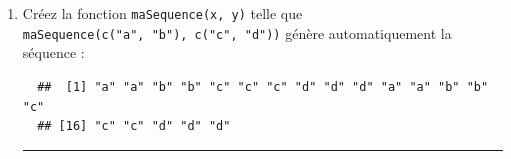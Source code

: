 \documentclass[12pt,twosided, notitlepage]{book}
\newenvironment{Shaded}{}{}
\newcommand{\KeywordTok}[1]{\textcolor[rgb]{0.00,0.00,1.00}{{#1}}}
\newcommand{\DataTypeTok}[1]{{#1}}
\newcommand{\DecValTok}[1]{{#1}}
\newcommand{\CommentTok}[1]{\textcolor[rgb]{0.00,0.50,0.00}{{#1}}}
\newcommand{\NormalTok}[1]{{#1}}
\newif \ifsol
\renewenvironment{Shaded}{\begin{snugshade}}{\end{snugshade}}
\begin{document}
\begin{enumerate}
  \ifsol 

  \begin{center} \rule{0.5\linewidth}{\linethickness}\end{center}

\begin{Shaded}
\begin{Highlighting}[]
\CommentTok{# Utilisation de l'argument times = de rep()}
\KeywordTok{rep}\NormalTok{(}\KeywordTok{c}\NormalTok{(}\DecValTok{1}\NormalTok{, }\DecValTok{2}\NormalTok{), }\DataTypeTok{times =} \DecValTok{2}\NormalTok{)}
  \NormalTok{## [1] 1 2 1 2}

\CommentTok{# Utilisation de l'argument each = de rep()}
\KeywordTok{rep}\NormalTok{(}\KeywordTok{c}\NormalTok{(}\DecValTok{1}\NormalTok{, }\DecValTok{2}\NormalTok{), }\DataTypeTok{each =} \DecValTok{3}\NormalTok{)}
  \NormalTok{## [1] 1 1 1 2 2 2}

\CommentTok{# Deux possibilités ici : }
\CommentTok{# - enchasser le second appel de rep() dans le premier}
\KeywordTok{rep}\NormalTok{(}\KeywordTok{rep}\NormalTok{(}\KeywordTok{c}\NormalTok{(}\DecValTok{1}\NormalTok{, }\DecValTok{2}\NormalTok{), }\DataTypeTok{each =} \DecValTok{3}\NormalTok{), }\DataTypeTok{times =} \DecValTok{2}\NormalTok{)}
  \NormalTok{##  [1] 1 1 1 2 2 2 1 1 1 2 2 2}
\CommentTok{# - utiliser directement rep() avec each = et times =}
\KeywordTok{rep}\NormalTok{(}\KeywordTok{c}\NormalTok{(}\DecValTok{1}\NormalTok{, }\DecValTok{2}\NormalTok{), }\DataTypeTok{each =} \DecValTok{3}\NormalTok{, }\DataTypeTok{times =} \DecValTok{2}\NormalTok{)}
  \NormalTok{##  [1] 1 1 1 2 2 2 1 1 1 2 2 2}
\end{Highlighting}
\end{Shaded}

  \begin{center} \rule{0.5\linewidth}{\linethickness}\end{center}

  \bigskip  \fi 
\item
  Créez la fonction \texttt{maSequence(x,\ y)} telle que
  \texttt{maSequence(c("a",\ "b"),\ c("c",\ "d"))} génère
  automatiquement la
  séquence :

\begin{verbatim}
  ##  [1] "a" "a" "b" "b" "c" "c" "c" "d" "d" "d" "a" "a" "b" "b" "c"
  ## [16] "c" "c" "d" "d" "d"
\end{verbatim}

  \ifsol 

  \begin{center} \rule{0.5\linewidth}{\linethickness}\end{center}


\end{enumerate}
\end{document}
